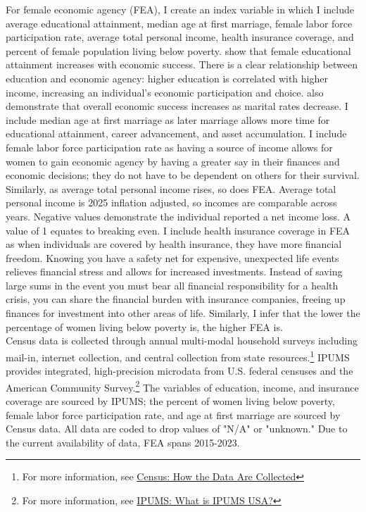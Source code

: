 \documentclass[12pt]{article}
\begin{document}
\indent For female economic agency (FEA), I create an index variable in which I include average educational attainment, median age at first marriage, female labor force participation rate, average total personal income, health insurance coverage, and percent of female population living below poverty. \cite{baileyanddiprete} show that female educational attainment increases with economic success. There is a clear relationship between education and economic agency: higher education is correlated with higher income, increasing an individual’s economic participation and choice. \cite{baileyanddiprete} also demonstrate that overall economic success increases as marital rates decrease. I include median age at first marriage as later marriage allows more time for educational attainment, career advancement, and asset accumulation. I include female labor force participation rate as having a source of income allows for women to gain economic agency by having a greater say in their finances and economic decisions; they do not have to be dependent on others for their survival. Similarly, as average total personal income rises, so does FEA. Average total personal income is 2025 inflation adjusted, so incomes are comparable across years. Negative values demonstrate the individual reported a net income loss. A value of 1 equates to breaking even. I include health insurance coverage in FEA as when individuals are covered by health insurance, they have more financial freedom. Knowing you have a safety net for expensive, unexpected life events relieves financial stress and allows for increased investments. Instead of saving large sums in the event you must bear all financial responsibility for a health crisis, you can share the financial burden with insurance companies, freeing up finances for investment into other areas of life. Similarly, I infer that the lower the percentage of women living below poverty is, the higher FEA is. \\
\indent Census data is collected through annual multi-modal household surveys including mail-in, internet collection, and central collection from state resources.\footnote{For more information, see \href{https://www.census.gov/programs-surveys/gov-finances/technical-documentation/methodology/how-the-data-are-collected.html}{Census: How the Data Are Collected}} IPUMS provides integrated, high-precision microdata from U.S. federal censuses and the American Community Survey.\footnote{For more information, see \href{https://usa.ipums.org/usa/intro.shtml}{IPUMS: What is IPUMS USA?}} The variables of education, income, and insurance coverage are sourced by IPUMS; the percent of women living below poverty, female labor force participation rate, and age at first marriage are sourced by Census data. All data are coded to drop values of "N/A" or "unknown." Due to the current availability of data, FEA spans 2015-2023.
\end{document}
